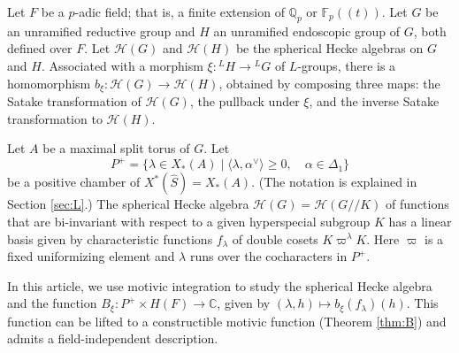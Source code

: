 
% 
% 


\newcommand{\XX}[1]{{\it  [To do: #1]}}
\newcommand{\ring}[1]{\mathbb{#1}}
\newcommand{\ang}[1]{\langle{#1}\rangle}
\def\op#1{{\operatorname{#1}}}
\def\inv{\op{inv}}
\def\dom{P^+}
\def\Q{{\ring{Q}}}
\def\card{\op{card}}
\def\CSrho{[W_S\backslash C_\rho]}

\def\C{\mathcal C}
\def\N{\mathcal N}
\def\H{\mathcal H}
\def\M{\mathcal M}
\def\T{\mathcal T}

\def\n{{\mathfrak n}}
\def\g{{\mathfrak g}}
\def\t{{\mathfrak t}}
\def\h{{\mathfrak h}}

\def\Frob{\op{Frob}}
\def\dotw{\dot w}
\def\uu{\upsilon} %

\def\libel#1{{\text{\sc [#1]~}}\label{#1}}
\def\rif#1{(\ref{#1}-{\text{\sc #1})}}




Let $F$ be a $p$-adic field; that is, a finite extension of
$\ring{Q}_p$ or $\ring{F}_p((t))$.  Let $G$ be an unramified reductive
group and $H$ an unramified endoscopic group of $G$, both defined over
$F$.  Let $\H(G)$ and $\H(H)$ be the spherical Hecke algebras on $G$
and $H$.  Associated with a morphism $\xi:{}^LH\to {}^LG$ of
$L$-groups, there is a homomorphism $b_\xi:\H(G)\to \H(H)$, obtained
by composing three maps: the Satake transformation of $\H(G)$, the
pullback under $\xi$, and the inverse Satake transformation to
$\H(H)$.

Let $A$ be a maximal split torus of $G$.  Let 
\[
\dom = \{\lambda\in X_*(A) \mid \ang{\lambda,\alpha^\vee}\ge 0,
\quad \alpha\in \Delta_1\}
\]
be a positive chamber of $X^*(\hat S) = X_*(A)$.  (The notation
is explained in Section \ref{sec:L}.)   The spherical
Hecke algebra $\H(G)=\H(G//K)$ of functions that are bi-invariant with
respect to a given hyperspecial subgroup $K$ has a linear basis given
by characteristic functions $f_\lambda$ of double cosets
$K\varpi^\lambda K$.  Here $\varpi$ is a fixed uniformizing element
and $\lambda$ runs over the cocharacters in
$P^+$.

In this article, we use motivic integration to study the spherical
Hecke algebra and the function $B_\xi:P^+\times
H(F)\to \ring{C}$, given by $(\lambda,h)\mapsto b_\xi(f_\lambda)(h)$.
This function can be lifted to a constructible motivic function
(Theorem \ref{thm:B}) and admits a field-independent description.


